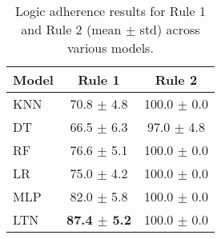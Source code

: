 \begin{table}
  \centering
  \begin{adjustbox}{max width=0.8\textwidth}
    \begin{tabular}{|l|c|c|}
      \hline
      \textbf{Model} & \textbf{Rule 1} & \textbf{Rule 2} \\
      \hline
      \gls{KNN}  & 70.8 $\pm$  4.8   & 100.0 $\pm$  0.0 \\
      \hline
      \gls{DT}   & 66.5 $\pm$  6.3   & 97.0 $\pm$  4.8 \\
      \hline
      \gls{RF}   & 76.6 $\pm$  5.1   & 100.0 $\pm$  0.0 \\
      \hline
      \gls{LR}   & 75.0 $\pm$  4.2   & 100.0 $\pm$  0.0 \\
      \hline
      \gls{MLP}  & 82.0 $\pm$  5.8   & 100.0 $\pm$  0.0 \\
      \hline
      \gls{LTN}  & \textbf{87.4 $\pm$  5.2 }  & 100.0 $\pm$  0.0 \\
      \hline
    \end{tabular}
  \end{adjustbox}
  \caption{
      Logic adherence results for Rule 1 and Rule 2 (mean $\pm$ std) across various models.
  }
  \label{tab:logic-adherence}
\end{table}